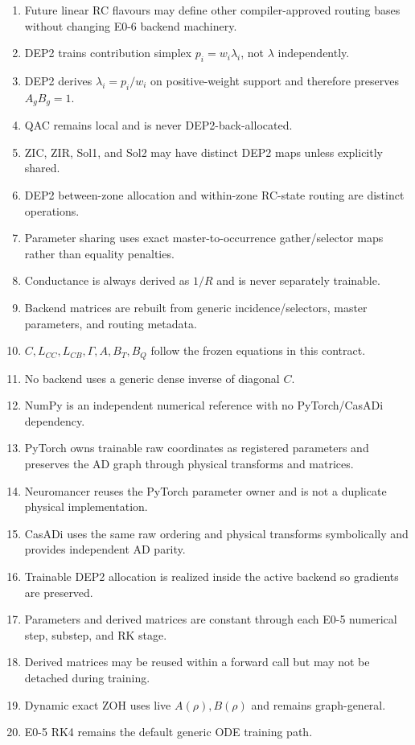 \documentclass[11pt]{article}
\begin{document}
\begin{enumerate}[leftmargin=*]
\item Future linear RC flavours may define other compiler-approved routing bases without changing E0-6 backend machinery.
\item DEP2 trains contribution simplex $p_i=w_i\lambda_i$, not $\lambda$ independently.
\item DEP2 derives $\lambda_i=p_i/w_i$ on positive-weight support and therefore preserves $A_gB_g=1$.
\item QAC remains local and is never DEP2-back-allocated.
\item ZIC, ZIR, Sol1, and Sol2 may have distinct DEP2 maps unless explicitly shared.
\item DEP2 between-zone allocation and within-zone RC-state routing are distinct operations.
\item Parameter sharing uses exact master-to-occurrence gather/selector maps rather than equality penalties.
\item Conductance is always derived as $1/R$ and is never separately trainable.
\item Backend matrices are rebuilt from generic incidence/selectors, master parameters, and routing metadata.
\item $C,L_{CC},L_{CB},\Gamma,A,B_T,B_Q$ follow the frozen equations in this contract.
\item No backend uses a generic dense inverse of diagonal $C$.
\item NumPy is an independent numerical reference with no PyTorch/CasADi dependency.
\item PyTorch owns trainable raw coordinates as registered parameters and preserves the AD graph through physical transforms and matrices.
\item Neuromancer reuses the PyTorch parameter owner and is not a duplicate physical implementation.
\item CasADi uses the same raw ordering and physical transforms symbolically and provides independent AD parity.
\item Trainable DEP2 allocation is realized inside the active backend so gradients are preserved.
\item Parameters and derived matrices are constant through each E0-5 numerical step, substep, and RK stage.
\item Derived matrices may be reused within a forward call but may not be detached during training.
\item Dynamic exact ZOH uses live $A(\rho),B(\rho)$ and remains graph-general.
\item E0-5 RK4 remains the default generic ODE training path.

\end{enumerate}
\end{document}
